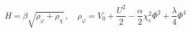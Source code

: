 \begin{equation}                                            \label{24}
  H{=}\beta\sqrt{\rho_{\varphi}{+}\rho_{\chi}}\,,\quad
  \rho_{\varphi}{=}V_{0}{+}\frac{U^{2}}{2}{-}\frac{\alpha}{2}
  \chi_{\text{c}}^{2}\Phi^{2}{+}\frac{\lambda}{4}\Phi^{4}
\end{equation}

